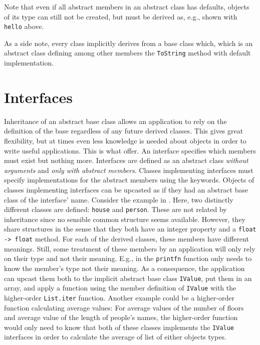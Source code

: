 Note that even if all abstract members in an abstract class has defaults, objects of its type can still not be created, but must be derived as, e.g., shown with \lstinline{hello} above.

As a side note, every class implicitly derives from a base class  which, which is an abstract class defining among other members the \lstinline{ToString} method with default implementation.

\section{Interfaces}
\label{sec:interfaces}
Inheritance of an abstract base class allows an application to rely on the definition of the base regardless of any future derived classes. This gives great flexibility, but at times even less knowledge is needed about objects in order to write useful applications. This is what  offer. An interface specifies which members must exist but nothing more. Interfaces are defined as an abstract class \emph{without arguments} and \emph{only with abstract members}. Classes implementing interfaces must specify implementations for the abstract members using the  keywords. Objects of classes implementing interfaces can be upcasted as if they had an abstract base class of the interface' name. Consider the example in .
%
%
Here, two distinctly different classes are defined: \lstinline{house} and \lstinline{person}. These are not related by inheritance since no sensible common structure seems available. However, they share structures in the sense that they both have an integer property and a \lstinline{float -> float} method. For each of the derived classes, these members have different meanings. Still, some treatment of these members by an application will only rely on their type and not their meaning. E.g., in  the \lstinline{printfn} function only needs to know the member's type not their meaning. As a consequence, the application can upcast them both to the implicit abstract base class \lstinline{IValue}, put them in an array, and apply a function using the member definition of \lstinline{IValue} with the higher-order \lstinline{List.iter} function. Another example could be a higher-order function calculating average values: For average values of the number of floors and average value of the length of people's names, the higher-order function would only need to know that both of these classes implements the \lstinline{IValue} interfaces in order to calculate the average of list of either objects types.

